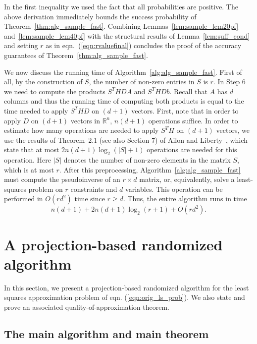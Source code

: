 \documentclass[11pt]{article}
\newcommand{\abs }[1]{\left|#1\right|}
\begin{document}
In the first inequality we used the fact that all probabilities are positive. The above derivation immediately bounds the success probability of Theorem~\ref{thm:alg_sample_fast}. Combining Lemmas~\ref{lem:sample_lem20pf} and~\ref{lem:sample_lem40pf} with the structural results of Lemma~\ref{lem:suff_cond} and setting $r$ as in eqn.~(\ref{eqn:rvaluefinal}) concludes the proof of the accuracy guarantees of Theorem~\ref{thm:alg_sample_fast}.

We now discuss the running time of Algorithm~\ref{alg:alg_sample_fast}. First of all, by the construction of $S$, the number of non-zero entries in $S$ is $r$. In Step $6$ we need to compute the products $S^THDA$ and $S^THDb$. Recall that $A$ has $d$ columns and thus the running time of computing both products is equal to the time needed to apply $S^THD$ on $(d+1)$ vectors. First, note that in order to apply $D$ on $(d+1)$ vectors in $\mathbb{R}^n$, $n(d+1)$ operations suffice. In order to estimate how many operations are needed to apply $S^TH$ on $(d+1)$ vectors, we use the results of Theorem~$2.1$ (see also Section 7) of Ailon and Liberty~\cite{AL08}, which state that at most $2n(d+1)\log_2 \left(\abs{S}+1\right)$ operations are needed for this operation. Here $\abs{S}$ denotes the number of non-zero elements in the matrix $S$, which is at most $r$. After this preprocessing, Algorithm~\ref{alg:alg_sample_fast} must compute the pseudoinverse of an $r \times d$ matrix, or, equivalently, solve a least-squares problem on $r$ constraints and $d$ variables. This operation can be performed in $O(rd^2)$ time since $r \geq d$. Thus, the entire algorithm runs in time
$$n(d+1) + 2n(d+1) \log_2 \left(r + 1\right) + O\left(rd^2 \right).$$


\section{A projection-based randomized algorithm}
\label{sxn:projection}

In this section, we present a projection-based randomized algorithm for the least squares approximation problem of eqn. (\ref{eqn:orig_ls_prob}). We also state and prove an associated quality-of-approximation theorem.

\subsection{The main algorithm and main theorem}
\label{sxn:projection:result}
\end{document}
